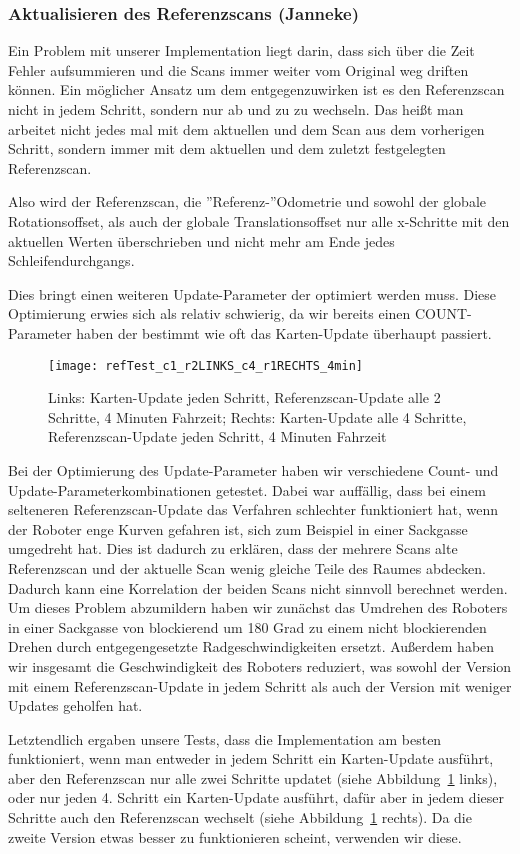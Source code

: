 \subsubsection{Aktualisieren des Referenzscans (Janneke)}

Ein Problem mit unserer Implementation liegt darin, dass sich über die Zeit Fehler aufsummieren und die Scans immer weiter vom Original weg driften können. Ein möglicher Ansatz um dem entgegenzuwirken ist es den Referenzscan nicht in jedem Schritt, sondern nur ab und zu zu wechseln. Das heißt man arbeitet nicht jedes mal mit dem aktuellen und dem Scan aus dem vorherigen Schritt, sondern immer mit dem aktuellen und dem zuletzt festgelegten Referenzscan.

Also wird der Referenzscan, die ''Referenz-''Odometrie und sowohl der globale Rotationsoffset, als auch der globale Translationsoffset nur alle x-Schritte mit den aktuellen Werten überschrieben und nicht mehr am Ende jedes Schleifendurchgangs.

Dies bringt einen weiteren Update-Parameter der optimiert werden muss. Diese Optimierung erwies sich als relativ schwierig, da wir bereits einen COUNT-Parameter haben der bestimmt wie oft das Karten-Update überhaupt passiert.

\begin{figure}
	\centering
	\texttt{[image: refTest\_c1\_r2LINKS\_c4\_r1RECHTS\_4min]}
	\caption{Links: Karten-Update jeden Schritt, Referenzscan-Update alle 2 Schritte, 4 Minuten Fahrzeit; Rechts: Karten-Update alle 4 Schritte, Referenzscan-Update jeden Schritt, 4 Minuten Fahrzeit\newline}
	\label{fig:refTest}
\end{figure}

Bei der Optimierung des Update-Parameter haben wir verschiedene Count- und Update-Parameterkombinationen getestet. Dabei war auffällig, dass bei einem selteneren Referenzscan-Update das Verfahren schlechter funktioniert hat, wenn der Roboter enge Kurven gefahren ist, sich zum Beispiel in einer Sackgasse umgedreht hat. Dies ist dadurch zu erklären, dass der mehrere Scans alte Referenzscan und der aktuelle Scan wenig gleiche Teile des Raumes abdecken. Dadurch kann eine Korrelation der beiden Scans nicht sinnvoll berechnet werden. Um dieses Problem abzumildern haben wir zunächst das Umdrehen des Roboters in einer Sackgasse von blockierend um 180 Grad zu einem nicht blockierenden Drehen durch entgegengesetzte Radgeschwindigkeiten ersetzt. Außerdem haben wir insgesamt die Geschwindigkeit des Roboters reduziert, was sowohl der Version mit einem Referenzscan-Update in jedem Schritt als auch der Version mit weniger Updates geholfen hat.

Letztendlich ergaben unsere Tests, dass die Implementation am besten funktioniert, wenn man entweder in jedem Schritt ein Karten-Update ausführt, aber den Referenzscan nur alle zwei Schritte updatet (siehe Abbildung~\ref{fig:refTest} links), oder nur jeden 4. Schritt ein Karten-Update ausführt, dafür aber in jedem dieser Schritte auch den Referenzscan wechselt (siehe Abbildung~\ref{fig:refTest} rechts). Da die zweite Version etwas besser zu funktionieren scheint, verwenden wir diese.
